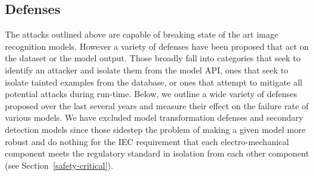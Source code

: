 \documentclass[journal]{IEEEtran}
\newcommand{\cm}[1]{\textit{{\color{blue}#1}}}
\begin{document}
\subsection{Defenses}
The attacks outlined above are capable of breaking state of the art image recognition models.  However a variety of defenses have been proposed that act on the dataset or the model output. Those broadly fall into categories that seek to identify an attacker and isolate them from the model API, ones that seek to isolate tainted examples from the database, or ones that attempt to mitigate all potential attacks during run-time. Below, we outline a wide variety of defenses proposed over the last several years and measure their effect on the failure rate of various models. We have excluded model transformation defenses and secondary detection models since those sidestep the problem of making a given model more robust and do nothing for the IEC requirement that each electro-mechanical component meets the regulatory standard in isolation from each other component (see Section~\ref{safety-critical}).




\end{document}
